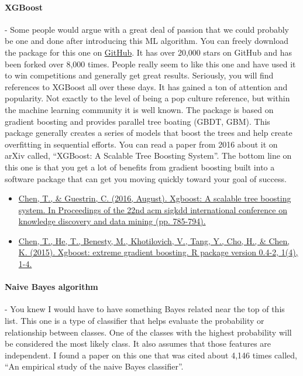 \documentclass{article}
\begin{document}
\paragraph{XGBoost} - Some people would argue with a great deal of passion that we could probably be one and done after introducing this ML algorithm. You can freely download the package for this one on \href{https://github.com/dmlc/xgboost}{GitHub}. It has over 20,000 stars on GitHub and has been forked over 8,000 times. People really seem to like this one and have used it to win competitions and generally get great results. Seriously, you will find references to XGBoost all over these days. It has gained a ton of attention and popularity. Not exactly to the level of being a pop culture reference, but within the machine learning community it is well known. The package is based on gradient boosting and provides parallel tree boating (GBDT, GBM). This package generally creates a series of models that boost the trees and help create overfitting in sequential efforts. You can read a paper from 2016 about it on arXiv called, “XGBoost: A Scalable Tree Boosting System”. The bottom line on this one is that you get a lot of benefits from gradient boosting built into a software package that can get you moving quickly toward your goal of success.
\begin{itemize}
\item \href{https://dl.acm.org/doi/pdf/10.1145/2939672.2939785}{Chen, T., \& Guestrin, C. (2016, August). Xgboost: A scalable tree boosting system. In Proceedings of the 22nd acm sigkdd international conference on knowledge discovery and data mining (pp. 785-794).} \cite{chen2016xgboost}
\item \href{https://cran.microsoft.com/snapshot/2017-12-11/web/packages/xgboost/vignettes/xgboost.pdf}{Chen, T., He, T., Benesty, M., Khotilovich, V., Tang, Y., Cho, H., \& Chen, K. (2015). Xgboost: extreme gradient boosting. R package version 0.4-2, 1(4), 1-4.} \cite{chen2015xgboost}
\end{itemize}

\paragraph{Naive Bayes algorithm} - You knew I would have to have something Bayes related near the top of this list. This one is a type of classifier that helps evaluate the probability or relationship between classes. One of the classes with the highest probability will be considered the most likely class. It also assumes that those features are independent. I found a paper on this one that was cited about 4,146 times called, “An empirical study of the naive Bayes classifier”.
\end{document}
